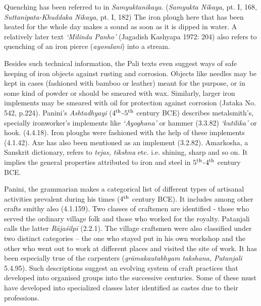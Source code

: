 \vspace{.05cm}

Quenching has been referred to in {\it Samyuktanikaya}. ({\it Samyukta Nikaya}, pt. I, 168, {\it Suttanipata-Khuddaka Nikaya}, pt. I, 182) The iron plough here that has been heated for the whole day makes a sound as soon as it is dipped in water. A relatively later text {\it ‘Milinda Panho’} (Jagadish Kashyapa 1972: 204) also refers to quenching of an iron pierce ({\it ayosulani}) into a stream.

\vspace{.05cm}

Besides such technical information, the Pali texts even suggest ways of safe keeping of iron objects against rusting and corrosion. Objects like needles may be kept in cases (fashioned with bamboo or leather) meant for the purpose, or in some kind of powder or should be smeared with wax. Similarly, larger iron implements may be smeared with oil for protection against corrosion (Jataka No. 542, p.224). Panini’s {\it Ashtadhyayi} ($4^{\rm th}$-$5^{\rm th}$ century BCE) describes metalsmith’s, specially ironworker’s implements like {\it ‘Ayoghana’} or hammer (3.3.82) {\it ‘kutilika’} or hook. (4.4.18). Iron ploughs were fashioned with the help of these implements (4.1.42). Axe has also been mentioned as an implement (3.2.82). Amarkosha, a Sanskrit dictionary, refers to {\it tejas, tikshna} etc. i.e. shining, sharp and so on. It implies the general properties attributed to iron and steel in $5^{\rm th}$-$4^{\rm th}$ century BCE.

\vspace{.05cm}

Panini, the grammarian makes a categorical list of different types of artisanal activities prevalent during his times ($4^{\rm th}$ century BCE). It includes among other crafts smithy also (4.1.159). Two classes of craftsmen are identified - those who served the ordinary village folk and those who worked for the royalty. Patanjali calls the latter {\it Rājaśilpī} (2.2.1). The village craftsmen were also classified under two distinct categories – the one who stayed put in his own workshop and the other who went out to work at different places and visited the site of work. It has been especially true of the carpenters ({\it grāmakautabhyam takshana, Patanjali} 5.4.95). Such descriptions suggest an evolving system of craft practices that developed into organised groups into the successive centuries. Some of these must have developed into specialized classes later identified as castes due to their professions. 

